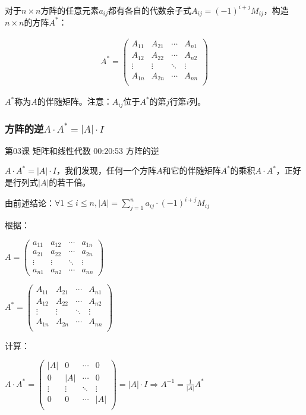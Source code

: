 \documentclass[UTF8]{ctexart}
\begin{document}
对于$n \times n$方阵的任意元素$a_{ij}$都有各自的代数余子式$A_{ij}=(-1)^{i+j}M_{ij}$，构造$n \times n$的方阵$A^{*}$：

\begin{equation}
\begin{aligned}
A^{*}=
\begin{pmatrix}
A_{11} & A_{21} & \cdots & A_{n1} \\
A_{12} & A_{22} & \cdots & A_{n2} \\
\vdots & \vdots & \ddots & \vdots \\
A_{1n} & A_{2n} & \cdots & A_{nn} \\
\end{pmatrix}
\end{aligned}
\end{equation}

$A^{*}$称为$A$的伴随矩阵。注意：$A_{ij}$位于$A^{*}$的第$j$行第$i$列。

\subsubsection{方阵的逆$A \cdot A^{*} = |A| \cdot I$}

第03课 矩阵和线性代数 00:20:53 方阵的逆

$A \cdot A^{*} = |A| \cdot I$，我们发现，任何一个方阵$A$和它的伴随矩阵$A^{*}$的乘积$A \cdot A^{*}$，正好是行列式$|A|$的若干倍。


由前述结论：$\forall 1 \leq i \leq n, |A|= \sum_{j=1}^{n} a_{ij} \cdot (-1)^{i+j} M_{ij}$

根据：

$A=
\begin{pmatrix}
a_{11} & a_{12} & \cdots & a_{1n} \\
a_{21} & a_{22}  & \cdots & a_{2n} \\
\vdots & \vdots  & \ddots & \vdots \\
a_{n1} & a_{n2}  & \cdots & a_{nn}
\end{pmatrix}$ \quad

$A^{*}=
\begin{pmatrix}
A_{11} & A_{21} & \cdots & A_{n1} \\
A_{12} & A_{22} & \cdots & A_{n2} \\
\vdots & \vdots & \ddots & \vdots \\
A_{1n} & A_{2n} & \cdots & A_{nn} \\
\end{pmatrix}$

计算：

$A \cdot A^{*}=
\begin{pmatrix}
|A| & 0 & \cdots & 0 \\
0 & |A| & \cdots & 0 \\
\vdots & \vdots & \ddots & \vdots \\
0 & 0 & \cdots & |A| \\
\end{pmatrix}
=|A| \cdot I \Rightarrow A^{-1}=\frac{1}{|A|}A^{*}$
\end{document}
